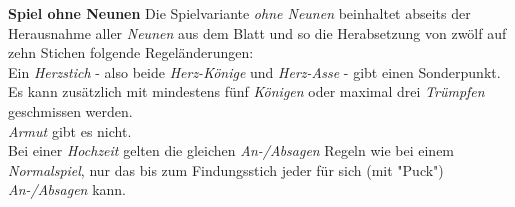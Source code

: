 \documentclass[11pt,a4paper,landscape]{article}
\begin{document}
\begin{multicols}{3}
\textbf{Spiel ohne Neunen} Die Spielvariante \textit{ohne Neunen} beinhaltet abseits der Herausnahme aller \textit{Neunen} aus dem Blatt und so die Herabsetzung von zwölf auf zehn Stichen folgende Regeländerungen: \\
Ein \textit{Herzstich} - also beide \textit{Herz-Könige} und \textit{Herz-Asse} - gibt einen Sonderpunkt. \\ Es kann zusätzlich mit mindestens fünf \textit{Königen} oder maximal drei \textit{Trümpfen} geschmissen werden. \\ \textit{Armut} gibt es nicht. \\ Bei einer \textit{Hochzeit} gelten die gleichen \textit{An-/Absagen} Regeln wie bei einem \textit{Normalspiel}, nur das bis zum Findungsstich jeder für sich (mit "Puck") \textit{An-/Absagen} kann.
\end{multicols}
\end{document}
